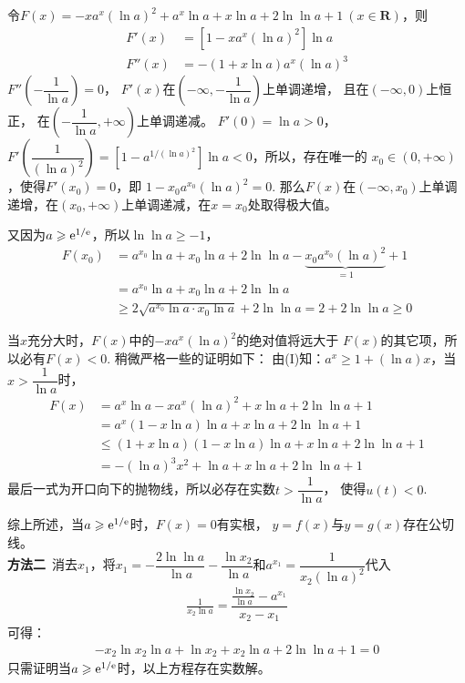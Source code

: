\begin{enumerate}[label={【\textbf{例\thechapter.\arabic*}】},
 leftmargin=\inteval{\myenumleftmargin}pt,
 itemsep=\inteval{\myenumitempsep}pt,
 itemindent=\inteval{\myenumitemindent}pt]
令$ F(x)=-xa^{x}(\ln a)^2+a^{x}\ln a +x\ln a+2\ln\ln a+1\ (x\in \textbf{R}) $，则
\begin{align*}
    F'(x)  &=[1-xa^x(\ln a)^2]\ln a    \\
    F''(x) &=-(1+x\ln a)a^x(\ln a)^3
\end{align*}
$ F''\left(-\dfrac{1}{\ln a}\right)=0 $，
$ F'(x) $在$ \left(-\infty,-\dfrac{1}{\ln a}\right) $上单调递增，
且在$ (-\infty,0) $上恒正，
在$ \left(-\dfrac{1}{\ln a},+\infty\right) $上单调递减。
$ F'(0)=\ln a>0 $，$ F'\left(\dfrac{1}{(\ln a)^2}\right)=
\left[1-a^{1/(\ln a)^2}\right]\ln a<0 $，所以，存在唯一的
$ x_0\in(0,+\infty) $，使得$ F'(x_0)=0 $，即
$ 1-x_0a^{x_0}(\ln a)^2=0 $. 那么$ F(x) $在$ (-\infty,x_0) $上单调递增，在$ (x_0,+\infty) $上单调递减，在$ x=x_0 $处取得极大值。

又因为$ a\geqslant \mathrm{e}^{1/\mathrm{e}} $，所以$ \ln\ln a\geq -1 $，
\begin{align*}
    F(x_0) &=a^{x_0}\ln a +x_0\ln a+2\ln\ln a-
    \underbrace{x_0a^{x_0}(\ln a)^2}_{=1}+1 \\
    &=a^{x_0}\ln a +x_0\ln a+2\ln\ln a \\
    &\geq 2\sqrt{a^{x_0}\ln a \cdot x_0\ln a} +2\ln\ln a
    =2+2\ln\ln a\geq 0
\end{align*}

当$ x $充分大时，$ F(x) $中的$ -xa^{x}(\ln a)^2 $的绝对值将远大于
$ F(x) $的其它项，所以必有$ F(x)<0 $. 稍微严格一些的证明如下：
由(I)知：$ a^x\geq 1+(\ln a)x $，当$ x>\dfrac{1}{\ln a} $时，
\begin{align*}
    F(x) &=a^{x}\ln a -xa^{x}(\ln a)^2+x\ln a+2\ln\ln a+1 \\
    &=a^{x}(1-x\ln a)\ln a+x\ln a+2\ln\ln a+1  \\
    &\leq(1+x\ln a)(1-x\ln a)\ln a+x\ln a+2\ln\ln a+1  \\
    &=-(\ln a)^3x^2+\ln a+x\ln a+2\ln\ln a+1
\end{align*}
最后一式为开口向下的抛物线，所以必存在实数$ t>\dfrac{1}{\ln a} $，
使得$ u(t)<0 $.

综上所述，当$ a\geqslant \mathrm{e}^{1/\mathrm{e}} $时，$ F(x)=0 $有实根，
$ y=f(x) $与$ y=g(x) $存在公切线。\\
\textbf{方法二}\ 消去$ x_1 $，将$ x_1=-\dfrac{2\ln\ln a}{\ln a}-
\dfrac{\ln x_2}{\ln a} $和$ a^{x_1}=\dfrac{1}{x_2(\ln a)^2} $代入
\begin{gather*}
    \frac{1}{x_2\ln a}=\dfrac{\frac{\ln x_2}{\ln a}-a^{x_1}}{x_2-x_1}
\end{gather*}
可得：
\begin{gather*}
    -x_2\ln x_2\ln a+\ln x_2 +x_2\ln a+2\ln\ln a+1=0
\end{gather*}
只需证明当$ a\geqslant \mathrm{e}^{1/\mathrm{e}} $时，以上方程存在实数解。


\end{enumerate}
